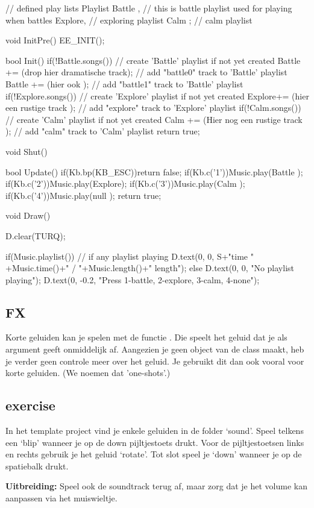 \begin{code}
// defined play lists
Playlist Battle , // this is battle playlist used for playing when battles
         Explore, // exploring playlist
         Calm   ; // calm playlist

void InitPre()
{
   EE_INIT();
}

bool Init()
{
   if(!Battle.songs())                         // create 'Battle' playlist if not yet created
   {
      Battle += (drop hier dramatische track); // add "battle0" track to 'Battle' playlist
      Battle += (hier ook                   ); // add "battle1" track to 'Battle' playlist
   }
   if(!Explore.songs())                        // create 'Explore' playlist if not yet created
   {
      Explore+= (hier een rustige track     ); // add "explore" track to 'Explore' playlist
   }
   if(!Calm.songs())                           // create 'Calm' playlist if not yet created
   {
      Calm   += (Hier nog een rustige track ); // add "calm" track to 'Calm' playlist
   }
   return true;
}

void Shut()
{
}

bool Update()
{
   if(Kb.bp(KB_ESC))return false;
   if(Kb.c('1'))Music.play(Battle );
   if(Kb.c('2'))Music.play(Explore);
   if(Kb.c('3'))Music.play(Calm   );
   if(Kb.c('4'))Music.play(null   );
   return true;
}

void Draw()
{
   D.clear(TURQ);

   if(Music.playlist()) // if any playlist playing
   {
      D.text(0, 0, S+"time " +Music.time()+" / "+Music.length()+" length");
   }else
   {
      D.text(0, 0, "No playlist playing");
   }
   D.text(0, -0.2, "Press 1-battle, 2-explore, 3-calm, 4-none");
}
\end{code}

\subsection{FX}
Korte geluiden kan je spelen met de functie . Die speelt het geluid dat je als argument geeft onmiddelijk af. Aangezien je geen object van de class  maakt, heb je verder geen controle meer over het geluid. Je gebruikt dit dan ook vooral voor korte geluiden. (We noemen dat 'one-shots'.)

\subsection{exercise}
In het template project vind je enkele geluiden in de folder `sound'. Speel telkens een `blip' wanneer je op de down pijltjestoets drukt. Voor de pijltjestoetsen links en rechts gebruik je het geluid `rotate'. Tot slot speel je `down' wanneer je op de spatiebalk drukt.

\textbf{Uitbreiding:} Speel ook de soundtrack terug af, maar zorg dat je het volume kan aanpassen via het muiswieltje.

 